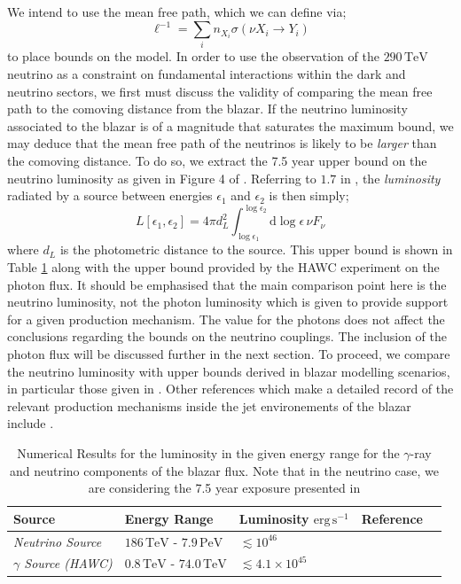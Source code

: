 \documentclass[11pt]{article}
\numberwithin{equation}{section}
\numberwithin{figure}{section}
\numberwithin{table}{section}
\newcommand{\upd}[1]{\text{d}#1 \,}
\begin{document}
We intend to use the mean free path, which we can define via;
\begin{equation}
  \ell^{-1} = \sum_{i}{n_{X_i} \sigma(\nu X_i \rightarrow Y_i)}
\end{equation}
to place bounds on the model. In order to use the observation of the $290 \, \textrm{TeV}$ neutrino as a constraint on fundamental interactions within the dark and neutrino sectors, we first must discuss the validity of comparing the mean free path to the comoving distance from the blazar. If the neutrino luminosity associated to the blazar is of a magnitude that saturates the maximum bound, we may deduce that the mean free path of the neutrinos is likely to be \textit{larger} than the comoving distance. To do so, we extract the 7.5 year upper bound on the neutrino luminosity as given in Figure 4 of \cite{Ackermann2018}. Referring to $1.7$ in \cite{dermer2009high}, the \textit{luminosity} radiated by a source between energies $\epsilon_1$ and $\epsilon_2$ is then simply;
\begin{equation}
  L[\epsilon_1, \epsilon_2] = 4\pi d_L^2 \int_{\log \epsilon_1}^{\log \epsilon_2}{\upd{\log\epsilon} \nu F_\nu }
\end{equation}
where $d_L$ is the photometric distance to the source. This upper bound is shown in Table \ref{tab:luminosity} along with the upper bound provided by the HAWC experiment on the photon flux. It should be emphasised that the main comparison point here is the neutrino luminosity, not the photon luminosity which is given to provide support for a given production mechanism. The value for the photons does not affect the conclusions regarding the bounds on the neutrino couplings. The inclusion of the photon flux will be discussed further in the next section. To proceed, we compare the neutrino luminosity with upper bounds derived in blazar modelling scenarios, in particular those given in \cite{Padovani2019}. Other references which make a detailed record of the relevant production mechanisms inside the jet environements of the blazar include \cite{Gao2018nat, Rodrigues2018, Padovani2018, Keivani2018}. 
\begin{table}[t]
\centering
\begin{tabular}{p{3.0cm}p{3cm}p{4cm}p{3.5cm}p{2.0cm}}
\toprule \textbf{Source} & \textbf{Energy Range} & \hfill \textbf{Luminosity} $\text{erg}\,\text{s}^{-1}$ & \textbf{Reference}\\
\midrule
\textit{Neutrino Source} & $186 \, \textrm{TeV}$ - $7.9 \, \textrm{PeV}$ & \hfill $\lesssim 10^{46}$ & \cite{Ackermann2018} \\
\textit{$\gamma$ Source (HAWC)} & $0.8 \, \textrm{TeV}$ - $74.0 \, \textrm{TeV}$  & \hfill $\lesssim 4.1 \times 10^{45}$ & \cite{Ackermann2018, HAWC} \\
\bottomrule
\end{tabular}
\caption{Numerical Results for the luminosity in the given energy range for the $\gamma$-ray and neutrino components of the blazar flux. Note that in the neutrino case, we are considering the 7.5 year exposure presented in \cite{Ackermann2018}}
\label{tab:luminosity}
\end{table}
\end{document}
